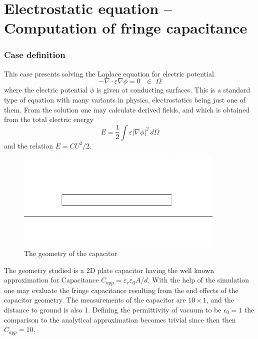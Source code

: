 \chapter{Electrostatic equation -- Computation of fringe capacitance}



\subsection*{Case definition}

This case presents solving the Laplace equation for electric potential.
\begin{equation}
  - \nabla \cdot \varepsilon \nabla \phi = 0  \, \, \, \, \in \, \, \Omega
\end{equation}
where the electric potential $\phi$ is given at conducting surfaces.
This is a standard type of equation with many variants in physics, electrostatics being just one of them.
From the solution one may calculate 
derived fields, and 
which is obtained from the total electric energy 
\begin{equation}
  E=\frac{1}{2} \int \varepsilon | \nabla \phi |^2 \, d\Omega
\end{equation}
and the relation $E=CU^2/2$.

\begin{figure}[h]
\centering
\includegraphics[width=10cm, viewport=0 20 640 280,clip]{capacitor}
\caption{The geometry of the capacitor}\label{fg:es_capacitor}
\end{figure} 

The geometry studied 
is a 2D plate capacitor having the well known approximation
for Capacitance $C_{app}=\varepsilon_r\varepsilon_0 A/d$.
With the help of the
simulation one may evaluate the fringe capacitance resulting
from the end effects of the capacitor geometry.
The measurements of the capacitor are $10 \times 1$, and the distance to
ground is also 1. Defining the permittivity of vacuum to be 
$\epsilon_0 = 1$ the comparison to the analytical approximation
becomes trivial since then then $C_{app} = 10$. 

